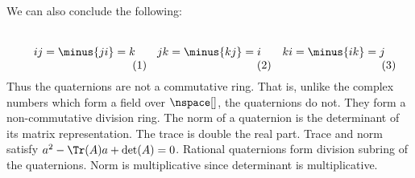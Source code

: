 \documentclass{article}                                                        %
\begin{document}
                We can also conclude the following:
                \par
                \begin{subequations}
                    \begin{minipage}[b]{0.32\textwidth}
                        \centering
                        \begin{equation}
                            ij=\minus{ji}=k
                        \end{equation}
                    \end{minipage}
                    \hfill
                    \begin{minipage}[b]{0.32\textwidth}
                        \centering
                        \begin{equation}
                            jk=\minus{kj}=i
                        \end{equation}
                    \end{minipage}
                    \hfill
                    \begin{minipage}[b]{0.32\textwidth}
                        \centering
                        \begin{equation}
                            ki=\minus{ik}=j
                        \end{equation}
                    \end{minipage}
                \end{subequations}
                Thus the quaternions are not a commutative ring. That is, unlike
                the complex numbers which form a field over $\nspace[]$, the
                quaternions do not. They form a non-commutative division ring.
                The norm of a quaternion is the determinant of its matrix
                representation. The trace is double the real part. Trace and
                norm satisfy $a^{2}-\Tr(A)a+\det(A)=0$. Rational quaternions
                form division subring of the quaternions. Norm is multiplicative
                since determinant is multiplicative.
\end{document}
